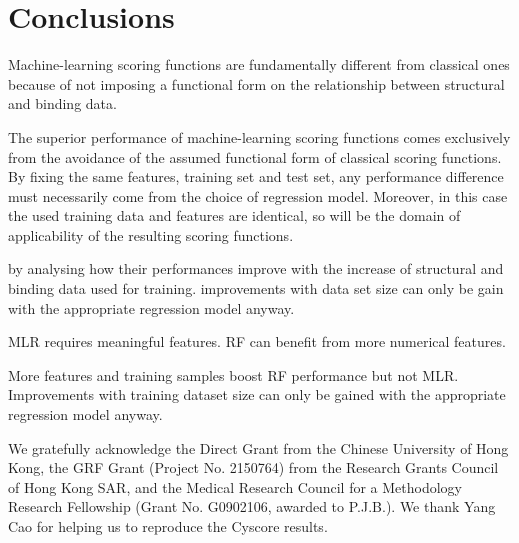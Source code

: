 \documentclass[journal=jacsat,manuscript=article]{achemso}
\begin{document}
\section{Conclusions}

Machine-learning scoring functions are fundamentally different from classical ones because of not imposing a functional form on the relationship between structural and binding data.

The superior performance of machine-learning scoring functions comes exclusively from the avoidance of the assumed functional form of classical scoring functions. By fixing the same features, training set and test set, any performance difference must necessarily come from the choice of regression model. Moreover, in this case the used training data and features are identical, so will be the domain of applicability of the resulting scoring functions. 

by analysing how their performances improve with the increase of structural and binding data used for training. improvements with data set size can only be gain with the appropriate regression model anyway.

MLR requires meaningful features. RF can benefit from more numerical features.

More features and training samples boost RF performance but not MLR. Improvements with training dataset size can only be gained with the appropriate regression model anyway.

\begin{acknowledgement}

We gratefully acknowledge the Direct Grant from the Chinese University of Hong Kong, the GRF Grant (Project No. 2150764) from the Research Grants Council of Hong Kong SAR, and the Medical Research Council for a Methodology Research Fellowship (Grant No. G0902106, awarded to P.J.B.). We thank Yang Cao for helping us to reproduce the Cyscore results.

\end{acknowledgement}

\begin{suppinfo}



\end{suppinfo}


\end{document}
